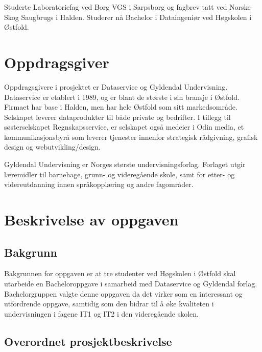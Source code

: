 \documentclass[norsk,a4paper,12pt]{article}
\begin{document}
Studerte Laboratoriefag ved Borg VGS i Sarpsborg og fagbrev tatt ved Norske Skog Saugbrugs i Halden. Studerer nå Bachelor i Dataingeniør ved Høgskolen i Østfold.


\section{Oppdragsgiver}

Oppdragsgivere i prosjektet er Dataservice og Gyldendal Undervisning. Dataservice er etablert i 1989, og er blant de største i sin bransje i Østfold. Firmaet har base i Halden, men har hele Østfold som sitt markedsområde. Selskapet leverer dataprodukter til både private og bedrifter. I tillegg til søsterselskapet Regnskapsservice, er selskapet også medeier i Odin media, et kommunikasjonsbyrå som leverer tjenester innenfor strategisk rådgivning, grafisk design og webutvikling/design.\newline

Gyldendal Undervisning er Norges største undervisningsforlag. Forlaget utgir læremidler til barnehage, grunn- og videregående skole, samt for etter- og videreutdanning innen språkopplæring og andre fagområder.

\newpage

\section{Beskrivelse av oppgaven}

\subsection{Bakgrunn}

Bakgrunnen for oppgaven er at tre studenter ved Høgskolen i Østfold skal utarbeide en Bacheloroppgave i samarbeid med Dataservice og Gyldendal forlag. 
Bachelorgruppen valgte denne oppgaven da det virker som en interessant og utfordrende oppgave, samtidig som den bidrar til å øke kvaliteten i undervisningen i fagene IT1 og IT2 i den videregående skolen. 

\subsection{Overordnet prosjektbeskrivelse}
\end{document}

